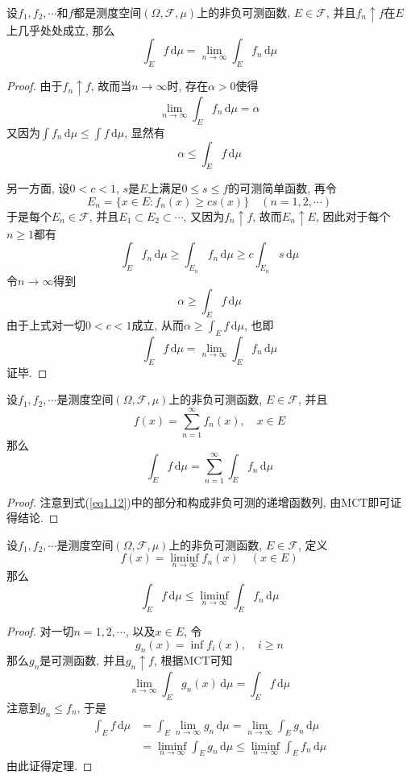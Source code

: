 \documentclass[cn, 12pt, math=mtpro2, bibstyle=apa, blue, twocol]{elegantbook}
\newcommand{\F}{\mathcal{F}}
\newcommand{\limn}{\lim_{n\to\infty}}
\newcommand{\du}{\,\text{d}\mu}
\begin{document}
\begin{theorem}
  设$f_1,f_2,\cdots$和$f$都是测度空间$(\Omega,\F,\mu)$上的非负可测函数, $E\in\F$, 并且$f_n\uparrow f$在$E$上几乎处处成立, 那么
  \begin{equation}
    \int_E f\,\text{d}\mu=\limn\int_E f_n\,\text{d}\mu \nonumber
  \end{equation}
\end{theorem}
\begin{proof}
  由于$f_n\uparrow f$, 故而当$n\to\infty$时, 存在$\alpha>0$使得
  $$\limn\int_{E}f_n\du=\alpha$$
又因为$\int f_n\,\text{d}\mu\leq \int f\du$, 显然有
$$\alpha\leq \int_Ef\du$$

另一方面, 设$0<c<1$, $s$是$E$上满足$0\leq s\leq f$的可测简单函数, 再令
$$E_n=\{x\in E: f_n(x)\geq cs(x)\}\quad (n=1,2,\cdots)$$
于是每个$E_n\in\F$, 并且$E_1\subset E_2\subset\cdots$, 又因为$f_n\uparrow f$, 故而$E_n\uparrow E$, 因此对于每个$n\geq1$都有
$$\int_Ef_n\du\geq\int_{E_n}f_n\du\geq c\int_{E_n}s\du$$
令$n\to\infty$得到
$$\alpha\geq\int_Ef\du$$
由于上式对一切$0<c<1$成立, 从而$\alpha\geq\int_Ef\du$, 也即
$$    \int_E f\,\text{d}\mu=\limn\int_E f_n\,\text{d}\mu \nonumber$$
证毕.
\end{proof}
\begin{corollary}\label{cor:cor1.1}
设$f_1,f_2,\cdots$是测度空间$(\Omega,\F,\mu)$上的非负可测函数, $E\in\F$, 并且
$$f(x)=\sum_{n=1}^{\infty}f_n(x),\quad x\in E$$
那么
\begin{equation}\label{eq1.12}
  \int_{E}f\du=\sum_{n=1}^{\infty}\int_Ef_n\du
\end{equation}
\end{corollary}
\begin{proof}
  注意到式(\ref{eq1.12})中的部分和构成非负可测的递增函数列, 由MCT即可证得结论.
\end{proof}
\begin{theorem}[Fatou引理]
  设$f_1,f_2,\cdots$是测度空间$(\Omega,\F,\mu)$上的非负可测函数, $E\in\F$, 定义
  $$f(x)=\liminf_{n\to\infty}f_n(x)\quad (x\in E)$$
  那么
  $$\int_Ef\du\leq\liminf_{n\to\infty}\int_Ef_n\du$$

\end{theorem}
\begin{proof}
  对一切$n=1,2,\cdots$, 以及$x\in E$, 令
  $$g_n(x)=\inf f_i(x), \quad i\geq n$$
  那么$g_n$是可测函数, 并且$g_n\uparrow f$, 根据MCT可知
  $$\limn \int_Eg_n(x)\du=\int_Ef\du$$
  注意到$g_n\leq f_n$, 于是
  \begin{align*}
  \int_Ef\du&=\int_E\limn g_n\du=\limn \int_E g_n\du \\
  &=\liminf_{n\to\infty}\int_Eg_n\du\leq\liminf_{n\to\infty}\int_E f_n\du
  \end{align*}
  由此证得定理.
\end{proof}
\end{document}
